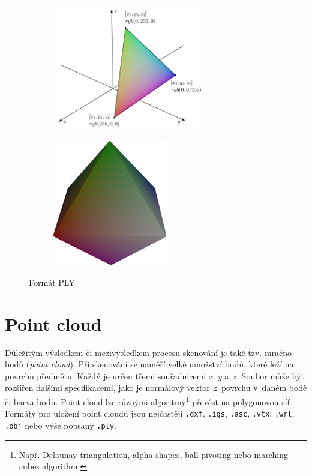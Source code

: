 \documentclass[12pt]{report}			%
\begin{document}
                \begin{figure}[h]
                    \centering
                    \begin{subfigure}{7cm}
                        \centering
                        \includegraphics[height=5.5cm]{images/trianglePLY.pdf}
                    \end{subfigure}
                    \hfill
                    \begin{subfigure}{7cm}
                        \centering
                        \includegraphics[height=5.5cm]{images/octaeder.png}
                    \end{subfigure}
                    \caption{Formát PLY}
                \end{figure}

            \section{Point cloud}

                Důležitým výsledkem či mezivýsledkem procesu skenování je také tzv. mračno bodů (\emph{point cloud}). Při skenování se naměří velké množství bodů, které leží na povrchu předmětu. Každý je určen třemi souřadnicemi \emph{x}, \emph{y} a~\emph{z}. Soubor může být rozšířen dalšími specifikacemi, jako je normálový vektor k~povrchu v~daném bodě či barva bodu. Point cloud lze různými algoritmy\footnote{Např. Delaunay triangulation, alpha shapes, ball pivoting nebo marching cubes algorithm.} převést na polygonovou síť.
                Formáty pro uložení point cloudů jsou nejčastěji \verb|.dxf|, \verb|.igs|, \verb|.asc|, \verb|.vtx|, \verb|.wrl|, \verb|.obj| nebo výše popsaný \verb|.ply|. \cite{mracnobodu}\cite{pointcloud}
    
\end{document}
